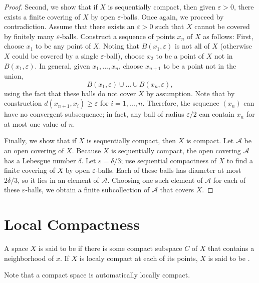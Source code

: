 \begin{proof}
    Second, we show that if $X$ is sequentially compact, then given $\varepsilon > 0$, there exists a finite covering of $X$ by open $\varepsilon$-balls. Once again, we proceed by contradiction. Assume that there exists an $\varepsilon > 0$ such that $X$ cannot be covered by finitely many $\varepsilon$-balls. Construct a sequence of points $x_n$ of $X$ as follows: First, choose $x_1$ to be any point of $X$. Noting that $B(x_1,\varepsilon)$ is not all of $X$ (otherwise $X$ could be covered by a single $\varepsilon$-ball), choose $x_2$ to be a point of $X$ not in $B(x_1,\varepsilon)$. In general, given $x_1,...,x_n$, choose $x_{n+1}$ to be a point not in the union, \begin{equation*}
        B(x_1,\varepsilon)\cup...\cup B(x_n,\varepsilon),
    \end{equation*}
    using the fact that these balls do not cover $X$ by assumption. Note that by construction $d(x_{n+1},x_i) \geq \varepsilon$ for $i = 1,...,n$. Therefore, the sequence $(x_n)$ can have no convergent subsequence; in fact, any ball of radius $\varepsilon/2$ can contain $x_n$ for at most one value of $n$.

    Finally, we show that if $X$ is sequentially compact, then $X$ is compact. Let $\mathcal{A}$ be an open covering of $X$. Because $X$ is sequentially compact, the open covering $\mathcal{A}$ has a Lebesgue number $\delta$. Let $\varepsilon = \delta/3$; use sequential compactness of $X$ to find a finite covering of $X$ by open $\varepsilon$-balls. Each of these balls has diameter at most $2\delta/3$, so it lies in an element of $\mathcal{A}$. Choosing one such element of $\mathcal{A}$ for each of these $\varepsilon$-balls, we obtain a finite subcollection of $\mathcal{A}$ that covers $X$.
\end{proof}


\section{Local Compactness}

\begin{definition}
    A space $X$ is said to be  if there is some compact subspace $C$ of $X$ that contains a neighborhood of $x$. If $X$ is localy compact at each of its points, $X$ is said to be .
\end{definition}

Note that a compact space is automatically locally compact.

